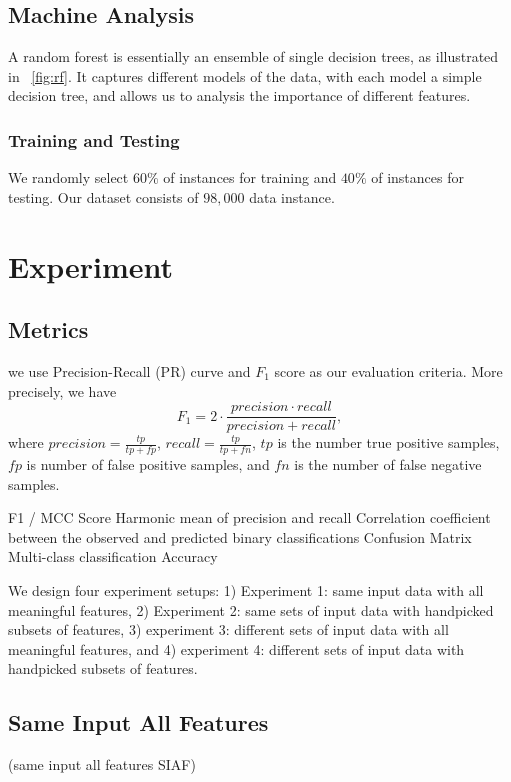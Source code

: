 \documentclass{sig-alternate}
\begin{document}
\subsection{Machine Analysis}
A random forest is essentially an ensemble of single decision trees, as illustrated in ~\ref{fig:rf}. It captures different models of the data, with each model a simple decision tree, and allows us to analysis the importance of different features.

\subsubsection{Training and Testing}
We randomly select $60\%$ of instances for training and $40\%$ of instances for testing. Our dataset consists of $98,000$ data instance.

\section{Experiment}

\subsection{Metrics}
we use Precision-Recall (PR) curve and $F_1$ score as our evaluation criteria. More precisely, we have
\begin{equation}
F_{1} = 2\cdot\frac{precision \cdot recall}{precision + recall},
\end{equation}
where $precision = \frac{tp}{tp+fp}$, $recall = \frac{tp}{tp+fn}$, $tp$ is the number true positive samples, $fp$ is number of false positive samples, and $fn$ is the number of false negative samples. 

F1 / MCC Score
Harmonic mean of precision and recall
Correlation coefficient between the observed and predicted binary classifications
Confusion Matrix
Multi-class classification Accuracy


We design four experiment setups: 1) Experiment 1: same input data with all meaningful features, 2) Experiment 2: same sets of input data with handpicked subsets of features, 3) experiment 3: different sets of input data with all meaningful features, and 4) experiment 4: different sets of input data with handpicked subsets of features.

\subsection{Same Input All Features}
(same input all features SIAF)
\end{document}
